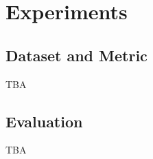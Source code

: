 \section{Experiments}
\label{sec:experiment}
%
\subsection{Dataset and Metric}

TBA

\subsection{Evaluation}

TBA

\endinput
